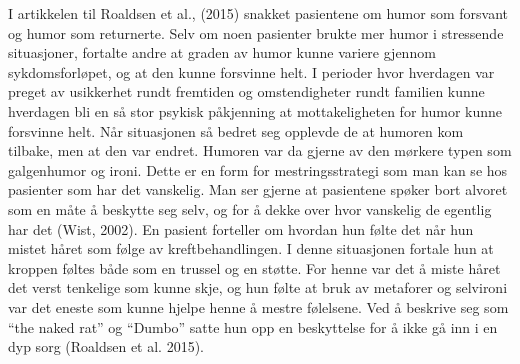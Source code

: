 I artikkelen til Roaldsen et al., (2015) snakket pasientene om humor som
forsvant og humor som returnerte. Selv om noen pasienter brukte mer humor i
stressende situasjoner, fortalte andre at graden av humor kunne variere gjennom
sykdomsforløpet, og at den kunne forsvinne helt. I perioder hvor hverdagen var
preget av usikkerhet rundt fremtiden og omstendigheter rundt familien kunne
hverdagen bli en så stor psykisk påkjenning at mottakeligheten for humor kunne
forsvinne helt. Når situasjonen så bedret seg opplevde de at humoren kom
tilbake, men at den var endret. Humoren var da gjerne av den mørkere typen som
galgenhumor og ironi.  Dette er en form for mestringsstrategi som man kan se
hos pasienter som har det vanskelig. Man ser gjerne at pasientene spøker bort
alvoret som en måte å beskytte seg selv, og for å dekke over hvor vanskelig de
egentlig har det (Wist, 2002). En pasient forteller om hvordan hun følte det
når hun mistet håret som følge av kreftbehandlingen. I denne situasjonen
fortale hun at kroppen føltes både som en trussel og en støtte. For henne var
det å miste håret det verst tenkelige som kunne skje, og hun følte at bruk av
metaforer og selvironi var det eneste som kunne hjelpe henne å mestre
følelsene. Ved å beskrive seg som “the naked rat” og “Dumbo” satte hun opp en
beskyttelse for å ikke gå inn i en dyp sorg (Roaldsen et al. 2015).
